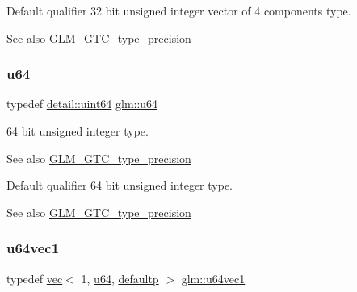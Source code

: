 Default qualifier 32 bit unsigned integer vector of 4 components type. \begin{DoxySeeAlso}{See also}
\mbox{\hyperlink{group__gtc__type__precision}{G\+L\+M\+\_\+\+G\+T\+C\+\_\+type\+\_\+precision}} 
\end{DoxySeeAlso}
\mbox{\label{group__gtc__type__precision_ga71cedd4972f9cb1a5e14dfe5ab83ecd7}} 
\subsubsection{\texorpdfstring{u64}{u64}}
{\footnotesize\ttfamily typedef \mbox{\hyperlink{namespaceglm_1_1detail_adec4b19bf4982125e122db2fe03c5810}{detail\+::uint64}} \mbox{\hyperlink{group__gtc__type__precision_ga71cedd4972f9cb1a5e14dfe5ab83ecd7}{glm\+::u64}}}

64 bit unsigned integer type. \begin{DoxySeeAlso}{See also}
\mbox{\hyperlink{group__gtc__type__precision}{G\+L\+M\+\_\+\+G\+T\+C\+\_\+type\+\_\+precision}}
\end{DoxySeeAlso}
Default qualifier 64 bit unsigned integer type. \begin{DoxySeeAlso}{See also}
\mbox{\hyperlink{group__gtc__type__precision}{G\+L\+M\+\_\+\+G\+T\+C\+\_\+type\+\_\+precision}} 
\end{DoxySeeAlso}
\mbox{\label{group__gtc__type__precision_gaf01aa7972f78cabc61558a0171d78a01}} 
\subsubsection{\texorpdfstring{u64vec1}{u64vec1}}
{\footnotesize\ttfamily typedef \mbox{\hyperlink{structglm_1_1vec}{vec}}$<$ 1, \mbox{\hyperlink{group__gtc__type__precision_ga71cedd4972f9cb1a5e14dfe5ab83ecd7}{u64}}, \mbox{\hyperlink{namespaceglm_a36ed105b07c7746804d7fdc7cc90ff25a9d21ccd8b5a009ec7eb7677befc3bf51}{defaultp}} $>$ \mbox{\hyperlink{group__gtc__type__precision_gaf01aa7972f78cabc61558a0171d78a01}{glm\+::u64vec1}}}

